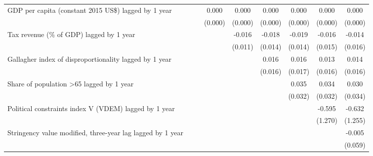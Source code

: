 \begin{tabular}{lcccccccc}
   GDP per capita (constant 2015 US\$) lagged by 1 year                &             &             & 0.000       & 0.000        & 0.000          & 0.000          & 0.000         & 0.000\\   
                                                                       &             &             & (0.000)     & (0.000)      & (0.000)        & (0.000)        & (0.000)       & (0.000)\\   
   Tax revenue (\% of GDP) lagged by 1 year                            &             &             &             & -0.016       & -0.018         & -0.019         & -0.016        & -0.014\\   
                                                                       &             &             &             & (0.011)      & (0.014)        & (0.014)        & (0.015)       & (0.016)\\   
   Gallagher index of disproportionality lagged by 1 year              &             &             &             &              & 0.016          & 0.016          & 0.013         & 0.014\\   
                                                                       &             &             &             &              & (0.016)        & (0.017)        & (0.016)       & (0.016)\\   
   Share of population >65 lagged by 1 year                            &             &             &             &              &                & 0.035          & 0.034         & 0.030\\   
                                                                       &             &             &             &              &                & (0.032)        & (0.032)       & (0.034)\\   
   Political constraints index V (VDEM) lagged by 1 year               &             &             &             &              &                &                & -0.595        & -0.632\\   
                                                                       &             &             &             &              &                &                & (1.270)       & (1.255)\\   
   Stringency value modified, three-year lag lagged by 1 year          &             &             &             &              &                &                &               & -0.005\\   
                                                                       &             &             &             &              &                &                &               & (0.059)\\   

\end{tabular}
